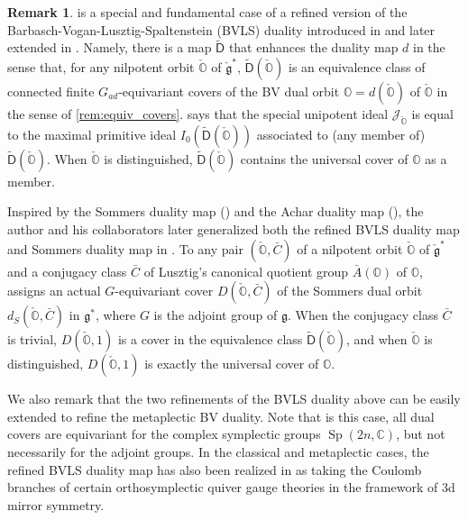 \documentclass[11pt, a4paper]{amsart}
\newcommand{\C}{\mathbb{C}}
\newcommand{\J}{\mathcal{J}}
\newcommand{\orb}{\mathbb{O}}
\newcommand{\fg}{\mathfrak{g}}
\newcommand{\ckfg}{{\check{\fg}}}
\newcommand{\ckorb}{\check{\orb}}
\newcommand{\Abar}{\bar{A}}
\newcommand{\Sp}{\operatorname{Sp}}
\theoremstyle{definition}
\newtheorem{Rem}[Thm]{Remark}
\numberwithin{equation}{section}
\begin{document}
\begin{Rem} \label{rem:BVLS_refined}
	 is a special and fundamental case of a refined version of the Barbasch-Vogan-Lusztig-Spaltenstein (BVLS) duality introduced in \cite{LMBM} and later extended in \cite{MBMY}. Namely, there is a map $\widetilde{\mathsf{D}}$ that enhances the duality map $d$ in the sense that, for any nilpotent orbit $\ckorb$ of $\ckfg^*$, $\widetilde{\mathsf{D}}(\ckorb)$ is an equivalence class of connected finite $G_{ad}$-equivariant covers of the BV dual orbit $\orb=d(\ckorb)$ of $\ckorb$ in the sense of \cref{rem:equiv_covers}. \cite[Proposition 9.2]{LMBM} says that the special unipotent ideal $\J_{\ckorb}$ is equal to the maximal primitive ideal $I_0(\widetilde{\mathsf{D}}(\ckorb))$ associated to (any member of) $\widetilde{\mathsf{D}}(\ckorb)$.
	When $\ckorb$ is distinguished, $\widetilde{\mathsf{D}}(\ckorb)$ contains the universal cover of $\orb$ as a member. 

	Inspired by the Sommers duality map (\cite{Sommers:Duality}) and the Achar duality map (\cite{Achar:duality}), the author and his collaborators later generalized both the refined BVLS duality map and Sommers duality map in \cite{MBMY}. To any pair $(\ckorb, \bar{C})$ of a nilpotent orbit $\ckorb$ of $\ckfg^*$ and a conjugacy class $\bar{C}$ of Lusztig's canonical quotient group $\Abar(\orb)$ of $\orb$, \cite{MBMY} assigns an actual $G$-equivariant cover $D(\ckorb, \bar{C})$ of the Sommers dual orbit $d_S(\ckorb, \bar{C})$ in $\fg^*$, where $G$ is the adjoint group of $\fg$. When the conjugacy class $\bar{C}$ is trivial, $D(\ckorb, 1)$ is a cover in the equivalence class $\widetilde{\mathsf{D}}(\ckorb)$, and when $\ckorb$ is distinguished, $D(\ckorb, 1)$ is exactly the universal cover of $\orb$.

	We also remark that the two refinements of the BVLS duality above can be easily extended to refine the metaplectic BV duality. Note that is this case, all dual covers are equivariant for the complex symplectic groups $\Sp(2n,\C)$, but not necessarily for the adjoint groups. In the classical and metaplectic cases, the refined BVLS duality map has also been realized in \cite{FHN} as taking the Coulomb branches of certain orthosymplectic quiver gauge theories in the framework of 3d mirror symmetry.  
\end{Rem}
\end{document}
